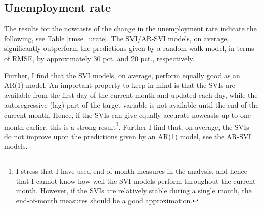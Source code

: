 \subsection{Unemployment rate}\label{urate}

The results for the nowcasts of the change in the unemployment rate indicate the following, see Table \ref{rmse_urate}. The SVI/AR-SVI models, on average, significantly outperform the predictions given by a random walk model, in terms of RMSE, by approximately 30 pct. and 20 pct., respectively.

Further, I find that the SVI models, on average, perform equally good as an AR(1) model. An important property to keep in mind is that the SVIs are available from the first day of the current month and updated each day, while the autoregressive (lag) part of the target variable is not available until the end of the current month. Hence, if the SVIs can give equally accurate nowcasts up to one month earlier, this is a strong result\footnote{I stress that I have used end-of-month measures in the analysis, and hence that I cannot know how well the SVI models perform throughout the current month. However, if the SVIs are relatively stable during a single month, the end-of-month measures should be a good approximation.}. Further I find that, on average, the SVIs do not improve upon the predictions given by an AR(1) model, see the AR-SVI models.
\vspace{0.5cm}

